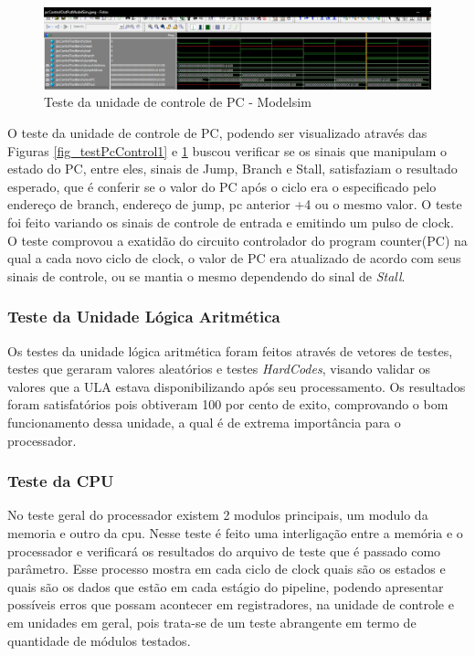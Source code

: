 \documentclass[
	11pt,				%
	openany,			%
	oneside,
	a4paper,			%
	chapter=TITLE,		%
	section=TITLE,		%
	english,			%
	brazil				%
	]{abntex2}
\begin{document}
\begin{figure}[H]
	\caption{\label{fig_testPcControl2}Teste da unidade de controle de PC - Modelsim}
	\begin{center}
	    \includegraphics[scale=0.5]{pcControlOutPutModelsim.PNG}
	\end{center}
\end{figure}

O teste da unidade de controle de PC, podendo ser visualizado através das Figuras \ref{fig_testPcControl1} e \ref{fig_testPcControl2} buscou verificar se os sinais que manipulam o estado do PC, entre eles, sinais de Jump, Branch e Stall, satisfaziam o resultado esperado, que é conferir se o valor do PC após o ciclo era o especificado pelo endereço de branch, endereço de jump, pc anterior +4 ou o mesmo valor. O teste foi feito variando os sinais de controle de entrada e emitindo um pulso de clock.        
        O teste comprovou a exatidão do circuito controlador do program counter(PC) na qual a cada novo ciclo de clock, o valor de PC era atualizado de acordo com seus sinais de controle, ou se mantia o mesmo dependendo do sinal de \textit{Stall}.
        
\subsubsection{Teste da Unidade Lógica Aritmética}
Os testes da unidade lógica aritmética foram feitos através de vetores de testes, testes que geraram valores aleatórios e testes \textit{HardCodes}, visando validar os valores que a ULA estava disponibilizando após seu processamento. Os resultados foram satisfatórios pois obtiveram 100 por cento de exito, comprovando o bom funcionamento dessa unidade, a qual é de extrema importância para o processador.  

\subsubsection{Teste da CPU}
No teste geral do processador existem 2 modulos principais, um modulo da memoria e outro da cpu. Nesse teste é feito uma interligação entre a memória e o processador e verificará os resultados do arquivo de teste que é passado como parâmetro.
Esse processo mostra em cada ciclo de clock quais são os estados e quais são os dados que estão em cada estágio do pipeline, podendo apresentar possíveis erros que possam acontecer em registradores, na unidade de controle e em unidades em geral, pois trata-se de um teste abrangente em termo de quantidade de módulos testados.
\end{document}
